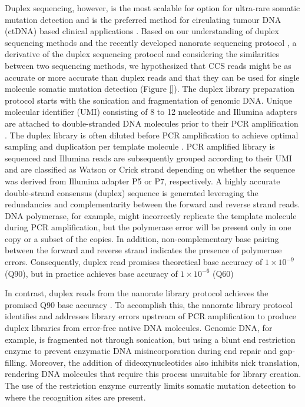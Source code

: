 Duplex sequencing, however, is the most scalable for option for ultra-rare somatic mutation detection and is the preferred method for circulating tumour DNA (ctDNA) based clinical applications \cite{Newman2016-cy}. Based on our understanding of duplex sequencing methods \cite{Schmitt2012-yr, Hoang2016-jx} and the recently developed nanorate sequencing protocol \cite{Abascal2021-pk}, a derivative of the duplex sequencing protocol and considering the similarities between two sequencing methods, we hypothesized that CCS reads might be as accurate or more accurate than duplex reads and that they can be used for single molecule somatic mutation detection (Figure \ref{}). The duplex library preparation protocol starts with the sonication and fragmentation of genomic DNA. Unique molecular identifier (UMI) consisting of 8 to 12 nucleotide and Illumina adapters are attached to double-stranded DNA molecules prior to their PCR amplification \cite{Schmitt2012-yr}. The duplex library is often diluted before PCR amplification to achieve optimal sampling and duplication per template molecule \cite{Hoang2016-jx, Abascal2021-pk}. PCR amplified library is sequenced and Illumina reads are subsequently grouped according to their UMI and are classified as Watson or Crick strand depending on whether the sequence was derived from Illumina adapter P5 or P7, respectively. A highly accurate double-strand consensus (duplex) sequence is generated leveraging the redundancies and complementarity between the forward and reverse strand reads. DNA polymerase, for example, might incorrectly replicate the template molecule during PCR amplification, but the polymerase error will be present only in one copy or a subset of the copies. In addition, non-complementary base pairing between the forward and reverse strand indicates the presence of polymerase errors. Consequently, duplex read promises theoretical base accuracy of $1 \times 10^{-9}$ (Q90), but in practice achieves base accuracy of $1 \times 10^{-6}$ (Q60) \cite{Schmitt2012-yr}

In contrast, duplex reads from the nanorate library protocol achieves the promised Q90 base accuracy \cite{Abascal2021-pk}. To accomplish this, the nanorate library protocol identifies and addresses library errors upstream of PCR amplification to produce duplex libraries from error-free native DNA molecules. Genomic DNA, for example, is fragmented not through sonication, but using a blunt end restriction enzyme to prevent enzymatic DNA misincorporation during end repair and gap-filling. Moreover, the addition of dideoxynucleotides also inhibits nick translation, rendering DNA molecules that require this process unsuitable for library creation. The use of the restriction enzyme currently limits somatic mutation detection to where the recognition sites are present.

